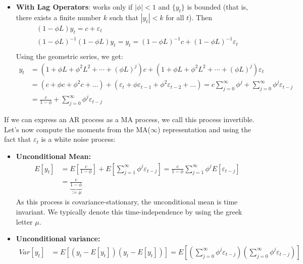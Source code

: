 \begin{enumerate}
\begin{itemize}
    \item \textbf{With Lag Operators}: works only if \(|\phi| < 1\) and \(\{y_t\}\) is bounded (that is, there exists a finite number \(k\) such that \(|y_t| < k\) for all \(t\)).
    Then
    \begin{align*}
    (1-\phi L) y_t = c + \varepsilon_t\\
    (1-\phi L)^{-1}(1-\phi L) y_t =	y_t = (1-\phi L)^{-1} c + (1-\phi L)^{-1}\varepsilon_t\\
    \end{align*}
    Using the geometric series, we get:
    \begin{align*}
    y_t &= (1+\phi L + \phi^2 L^2+\cdots+(\phi L)^j) c
        + (1+\phi L + \phi^2 L^2+\cdots+(\phi L)^j)\varepsilon_t
\\
        &= \left(c + \phi c + \phi^2 c + \ldots \right) + \left(\varepsilon_t + \phi \varepsilon_{t-1} + \phi^2 \varepsilon_{t-2}+\ldots\right)
        = c \sum_{j=0}^\infty \phi^j + \sum_{j=0}^\infty \phi^j \varepsilon_{t-j}
        \\
        &= \frac{c}{1-\phi} + \sum_{j=0}^\infty \phi^j \varepsilon_{t-j}
    \end{align*}
    \end{itemize}
    If we can express an AR process as a MA process, we call this process invertible.
    Let's now compute the moments from the MA(\(\infty\)) representation
      and using the fact that \(\varepsilon_t\) is a white noise process:
    \begin{itemize}
      \item \textbf{Unconditional Mean:}
      \begin{align*}
      E[y_t] &= E\left[\frac{c}{1-\phi}\right] + E\left[\sum_{j=1}^{\infty} \phi^j \varepsilon_{t-j}\right] = \frac{c}{1-\phi} \sum_{j=1}^{\infty} \phi^j E[\varepsilon_{t-j}]
      \\
      &= \underbrace{\frac{c}{1-\phi}}_{:=\mu}
      \end{align*}
      As this process is covariance-stationary, the unconditional mean is time invariant.
      We typically denote this time-independence by using the greek letter $\mu$.
      \item \textbf{Unconditional variance:}
      \begin{align*}
      Var[y_t] &= E\left[(y_t -E[y_t])(y_t - E[y_t])\right] = E\left[\left(\sum_{j=0}^\infty \phi^j \varepsilon_{t-j}\right) \left(\sum_{j=0}^\infty \phi^j \varepsilon_{t-j}\right) \right]
      \\

\end{align*}
\end{itemize}
\end{enumerate}
